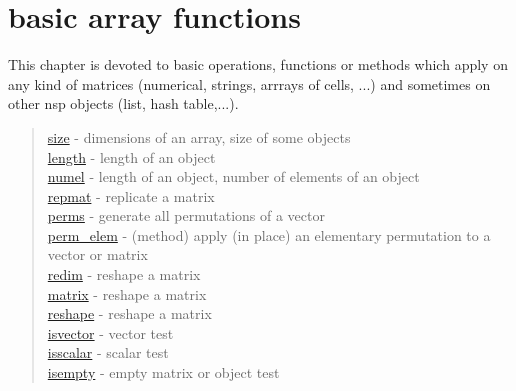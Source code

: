 \chapter*{basic array functions}

This chapter is devoted to basic operations, functions or methods which apply on
any kind of matrices (numerical, strings, arrrays of cells, ...) and sometimes
on other nsp objects (list, hash table,...).

\begin{quote}
\noindent
\hyperlink{size}{size} - dimensions of an array, size of some objects \\
\hyperlink{length}{length} - length of an object  \\
\hyperlink{numel}{numel} - length of an object, number of elements of an object  \\
\hyperlink{repmat}{repmat} - replicate a matrix\\
\hyperlink{perms}{perms} - generate all permutations of a vector\\
\hyperlink{perm_elem}{perm\_elem} - (method) apply (in place) an elementary permutation to a vector or matrix \\
\hyperlink{redim}{redim} - reshape a matrix\\
\hyperlink{matrix}{matrix} - reshape a matrix\\
\hyperlink{reshape}{reshape} - reshape a matrix\\
\hyperlink{isvector}{isvector} - vector test\\
\hyperlink{isscalar}{isscalar} - scalar test\\
\hyperlink{isempty}{isempty} - empty matrix or object test\\
\end{quote}

%








